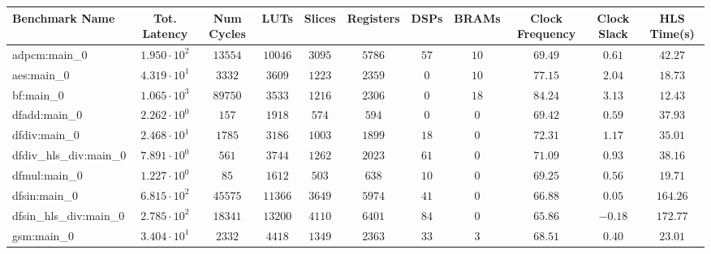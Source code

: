 \begin{tabular}{|l|c|c|c|c|c|c|c|c|c|c|}
\hline
Benchmark Name          & Tot. Latency           & Num Cycles & LUTs      & Slices    & Registers & DSPs    & BRAMs   & Clock Frequency & Clock Slack & HLS Time(s) \\
\hline
adpcm:main\_0           & $ 1.950 \cdot 10^{2} $ & $ 13554  $ & $ 10046 $ & $ 3095  $ & $ 5786  $ & $ 57  $ & $ 10  $ & $ 69.49       $ & $ 0.61    $ & $ 42.27   $ \\
aes:main\_0             & $ 4.319 \cdot 10^{1} $ & $ 3332   $ & $ 3609  $ & $ 1223  $ & $ 2359  $ & $ 0   $ & $ 10  $ & $ 77.15       $ & $ 2.04    $ & $ 18.73   $ \\
bf:main\_0              & $ 1.065 \cdot 10^{3} $ & $ 89750  $ & $ 3533  $ & $ 1216  $ & $ 2306  $ & $ 0   $ & $ 18  $ & $ 84.24       $ & $ 3.13    $ & $ 12.43   $ \\
dfadd:main\_0           & $ 2.262 \cdot 10^{0} $ & $ 157    $ & $ 1918  $ & $ 574   $ & $ 594   $ & $ 0   $ & $ 0   $ & $ 69.42       $ & $ 0.59    $ & $ 37.93   $ \\
dfdiv:main\_0           & $ 2.468 \cdot 10^{1} $ & $ 1785   $ & $ 3186  $ & $ 1003  $ & $ 1899  $ & $ 18  $ & $ 0   $ & $ 72.31       $ & $ 1.17    $ & $ 35.01   $ \\
dfdiv\_hls\_div:main\_0 & $ 7.891 \cdot 10^{0} $ & $ 561    $ & $ 3744  $ & $ 1262  $ & $ 2023  $ & $ 61  $ & $ 0   $ & $ 71.09       $ & $ 0.93    $ & $ 38.16   $ \\
dfmul:main\_0           & $ 1.227 \cdot 10^{0} $ & $ 85     $ & $ 1612  $ & $ 503   $ & $ 638   $ & $ 10  $ & $ 0   $ & $ 69.25       $ & $ 0.56    $ & $ 19.71   $ \\
dfsin:main\_0           & $ 6.815 \cdot 10^{2} $ & $ 45575  $ & $ 11366 $ & $ 3649  $ & $ 5974  $ & $ 41  $ & $ 0   $ & $ 66.88       $ & $ 0.05    $ & $ 164.26  $ \\
dfsin\_hls\_div:main\_0 & $ 2.785 \cdot 10^{2} $ & $ 18341  $ & $ 13200 $ & $ 4110  $ & $ 6401  $ & $ 84  $ & $ 0   $ & $ 65.86       $ & $ -0.18   $ & $ 172.77  $ \\
gsm:main\_0             & $ 3.404 \cdot 10^{1} $ & $ 2332   $ & $ 4418  $ & $ 1349  $ & $ 2363  $ & $ 33  $ & $ 3   $ & $ 68.51       $ & $ 0.40    $ & $ 23.01   $ \\

\end{tabular}
